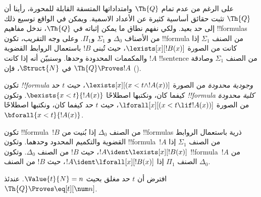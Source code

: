 \documentclass[../../../include/open-logic-section]{subfiles}
\begin{document}

على الرغم من عدم تمام $\Th{Q}$ وامتداداتها المتسقة القابلة للمحورة،
رأينا أن $\Th{Q}$ تثبت حقائق أساسية كثيرة عن الأعداد الاسمية. ويمكن
في الواقع توسيع ذلك إلى حد بعيد. ولكي نفهم نطاق ما يمكن إثباته في
$\Th{Q}$، ندخل مفاهيم !!{formula}s من الأصناف $\Delta_0$ و
$\Sigma_1$ و$\Pi_1$. وعلى وجه التقريب، تكون !!{formula} من الصنف
$\Sigma_1$ إذا كانت من الصورة $\lexists[x][!B(x)]$، حيث تُبنى $!B$
باستعمال الروابط القضوية والمكممات المحدودة وحدها. وسنبيّن أنه إذا
كانت $!A$ !!{sentence} من الصنف $\Sigma_1$ وصادقة في $\Struct{N}$،
فإن $\Th{Q}\Proves !A$
().

\begin{defn}
تكون \emph{!!{formula} وجودية محدودة} من الصورة
$\lexists[x][(x<t\land !A(x))]$، حيث $t$ حد كيفما كان، ونكتبها
اصطلاحًا $\bexists{x<t}{!A(x)}$.
%
وتكون \emph{!!{formula} كلية محدودة} من الصورة
$\lforall[x][(x<t\lif !A(x))]$، حيث $t$ حد كيفما كان، ونكتبها
اصطلاحًا $\bforall{x<t}{!A(x)}$.
\end{defn}

\begin{defn}
تكون !!{formula}~$!B$ من الصنف $\Delta_0$ إذا بُنيت من
!!{formula}s ذرية باستعمال الروابط القضوية والتكميم المحدود وحدهما.
%
وتكون !!{formula}~$!A$ من الصنف $\Sigma_1$ إذا
$!A\ident\lexists[x][!B(x)]$، حيث $!B$ من الصنف $\Delta_0$.
%
وتكون !!{formula}~$!A$ من الصنف $\Pi_1$ إذا
$!A\ident\lforall[x][!B(x)]$، حيث $!B$ من الصنف $\Delta_0$.
\end{defn}

\begin{lem}
 افترض أن $t$ حد مغلق بحيث
$\Value{t}{N}=n$. عندئذ $\Th{Q}\Proves\eq[t][\num n]$.
\end{lem}
\end{document}
